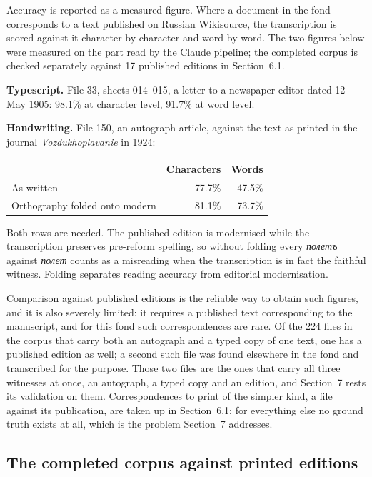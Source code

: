 \documentclass[11pt,a4paper]{article}
\begin{document}
Accuracy is reported as a measured figure. Where a document in the fond
corresponds to a text published on Russian Wikisource, the transcription is
scored against it character by character and word by word. The two figures
below were measured on the part read by the Claude pipeline; the completed
corpus is checked separately against 17 published editions in Section~6.1.

\textbf{Typescript.} File 33, sheets 014--015, a letter to a newspaper editor dated
12 May 1905: 98.1\% at character level, 91.7\% at word level.

\textbf{Handwriting.} File 150, an autograph article, against the text as printed
in the journal \emph{Vozdukhoplavanie} in 1924:

\begin{longtable}[]{@{}lrr@{}}
\toprule\noalign{}
& Characters & Words \\
\midrule\noalign{}
\endhead
\bottomrule\noalign{}
\endlastfoot
As written & 77.7\% & 47.5\% \\
Orthography folded onto modern & 81.1\% & 73.7\% \\
\end{longtable}

Both rows are needed. The published edition is modernised while the
transcription preserves pre-reform spelling, so without folding every \emph{полетъ}
against \emph{полет} counts as a misreading when the transcription is in fact the
faithful witness. Folding separates reading accuracy from editorial
modernisation.

Comparison against published editions is the reliable way to obtain such
figures, and it is also severely limited: it requires a published text
corresponding to the manuscript, and for this fond such correspondences are
rare. Of the 224 files in the corpus that carry both an autograph and a typed
copy of one text, one has a published edition as well; a second such file was
found elsewhere in the fond and transcribed for the purpose. Those two files
are the ones that carry all three witnesses at once, an autograph, a typed
copy and an edition, and Section~7 rests its validation on them.
Correspondences to print of the simpler kind, a file against its publication,
are taken up in Section~6.1; for everything else no ground truth exists at
all, which is the problem Section~7 addresses.

\subsection{The completed corpus against printed editions}\label{the-completed-corpus-against-printed-editions}
\end{document}
